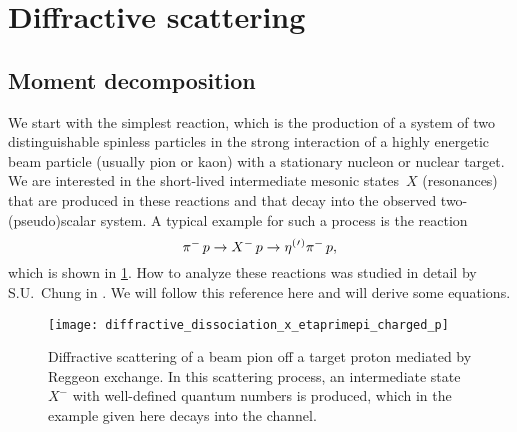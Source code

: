 \section{Diffractive scattering}%
\label{sec:diffraction}

\subsection{Moment decomposition}%
\label{sec:diffraction:moment}

We start with the simplest reaction, which is the production of a
system of two distinguishable spinless particles in the strong
interaction of a highly energetic beam particle (usually pion or kaon)
with a stationary nucleon or nuclear target.  We are interested in the
short-lived intermediate mesonic states~$X$ (resonances) that are
produced in these reactions and that decay into the observed
two-(pseudo)scalar system.  A typical example for such a process is
the reaction
\begin{equation}
  \pi^-\, p \to X^-\, p \to \etaOrPrPim\, p,
\end{equation}
which is shown in \cref{fig:diffractive_etaprimepi}.  How to analyze
these reactions was studied in detail by S.U.~Chung in
.  We will follow this reference here and will
derive some equations.

\begin{figure}[bp]
  \centering%
  \texttt{[image: diffractive\_dissociation\_x\_etaprimepi\_charged\_p]}%
  \caption{Diffractive scattering of a beam pion off a target proton
  mediated by Reggeon exchange.  In this scattering process, an
  intermediate state~$X^-$ with well-defined quantum numbers is
  produced, which in the example given here decays into the
  \etaOrPrPim channel.}%
  \label{fig:diffractive_etaprimepi}%
\end{figure}

